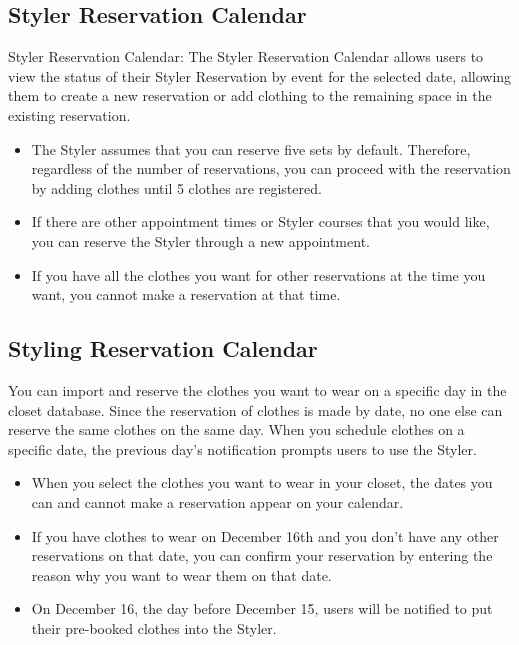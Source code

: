 \documentclass[conference]{IEEEtran}
\begin{document}
\subsection{Styler Reservation Calendar}
Styler Reservation Calendar: The Styler Reservation Calendar allows users to view the status of their Styler Reservation by event for the selected date, allowing them to create a new reservation or add clothing to the remaining space in the existing reservation.\\
\begin{itemize}
    \item The Styler assumes that you can reserve five sets by default. Therefore, regardless of the number of reservations, you can proceed with the reservation by adding clothes until 5 clothes are registered.\\
    \item If there are other appointment times or Styler courses that you would like, you can reserve the Styler through a new appointment.\\
    \item If you have all the clothes you want for other reservations at the time you want, you cannot make a reservation at that time.\\
\end{itemize}

\subsection{Styling Reservation Calendar}
You can import and reserve the clothes you want to wear on a specific day in the closet database. Since the reservation of clothes is made by date, no one else can reserve the same clothes on the same day. When you schedule clothes on a specific date, the previous day's notification prompts users to use the Styler.\\
\begin{itemize}
\item
When you select the clothes you want to wear in your closet, the dates you can and cannot make a reservation appear on your calendar.\\
\item
If you have clothes to wear on December 16th and you don't have any other reservations on that date, you can confirm your reservation by entering the reason why you want to wear them on that date.\\
\item
On December 16, the day before December 15, users will be notified to put their pre-booked clothes into the Styler.\\
\end{itemize}
\end{document}
